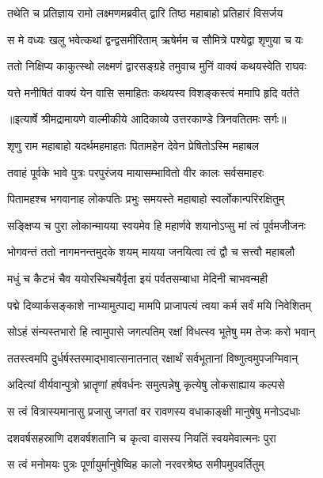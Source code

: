 \twolineshloka
{तथेति च प्रतिज्ञाय रामो लक्ष्मणमब्रवीत्}
{द्वारि तिष्ठ महाबाहो प्रतिहारं विसर्जय} %

\twolineshloka
{स मे वध्यः खलु भवेत्कथां द्वन्द्वसमीरिताम्}
{ऋषेर्मम च सौमित्रे पश्येद्वा शृणुया च यः} %

\twolineshloka
{ततो निक्षिप्य काकुत्स्थो लक्ष्मणं द्वारसङ्ग्रहे}
{तमुवाच मुनिं वाक्यं कथयस्वेति राघवः} %

\twolineshloka
{यत्ते मनीषितं वाक्यं येन वासि समाहितः}
{कथयस्व विशङ्कस्त्वं ममापि हृदि वर्तते} %


{॥इत्यार्षे श्रीमद्रामायणे वाल्मीकीये आदिकाव्ये उत्तरकाण्डे त्रिनवतितमः सर्गः॥}


\twolineshloka
{शृणु राम महाबाहो यदर्थमहमाहतः}
{पितामहेन देवेन प्रेषितोऽस्मि महाबल} %

\twolineshloka
{तवाहं पूर्वके भावे पुत्रः परपुरंजय}
{मायासम्भावितो वीर कालः सर्वसमाहरः} %

\twolineshloka
{पितामहश्च भगवानाह लोकपतिः प्रभुः}
{समयस्ते महाबाहो स्वर्लोकान्परिरक्षितुम्} %

\twolineshloka
{सङ्क्षिप्य च पुरा लोकान्मायया स्वयमेव हि}
{महार्णवे शयानोऽप्सु मां त्वं पूर्वमजीजनः} %

\twolineshloka
{भोगवन्तं ततो नागमनन्तमुदके शयम्}
{मायया जनयित्वा त्वं द्वौ च सत्त्वौ महाबलौ} %

\twolineshloka
{मधुं च कैटभं चैव ययोरस्थिचयैर्वृता}
{इयं पर्वतसम्बाधा मेदिनी चाभवन्मही} %

\twolineshloka
{पद्मे दिव्यार्कसङ्काशे नाभ्यामुत्पाद्य मामपि}
{प्राजापत्यं त्वया कर्म सर्वं मयि निवेशितम्} %

\twolineshloka
{सोऽहं संन्यस्तभारो हि त्वामुपासे जगत्पतिम्}
{रक्षां विधत्स्व भूतेषु मम तेजः करो भवान्} %

\twolineshloka
{ततस्त्वमपि दुर्धर्षस्तस्माद्भावात्सनातनात्}
{रक्षार्थं सर्वभूतानां विष्णुत्वमुपजग्मिवान्} %

\twolineshloka
{अदित्यां वीर्यवान्पुत्रो भ्रातॄणां हर्षवर्धनः}
{समुत्पन्नेषु कृत्येषु लोकसाह्याय कल्पसे} %

\twolineshloka
{स त्वं वित्रास्यमानासु प्रजासु जगतां वर}
{रावणस्य वधाकाङ्क्षी मानुषेषु मनोऽदधाः} %

\twolineshloka
{दशवर्षसहस्राणि दशवर्षशतानि च}
{कृत्वा वासस्य नियतिं स्वयमेवात्मनः पुरा} %

\twolineshloka
{स त्वं मनोमयः पुत्रः पूर्णायुर्मानुषेष्विह}
{कालो नरवरश्रेष्ठ समीपमुपवर्तितुम्} %

